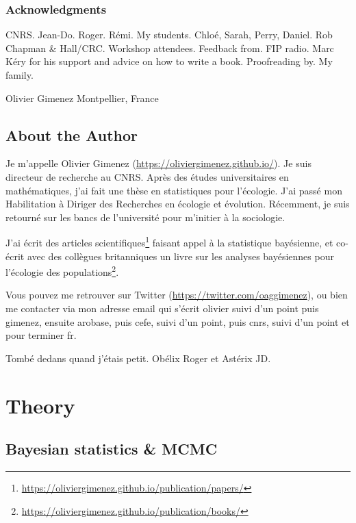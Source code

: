 \documentclass[
  12pt,
]{krantz}
\renewcommand{\href}[2]{#2\footnote{\url{#1}}}
\begin{document}
\hypertarget{acknowledgments}{%
\section*{Acknowledgments}\label{acknowledgments}}


CNRS. Jean-Do. Roger. Rémi. My students. Chloé, Sarah, Perry, Daniel. Rob Chapman \& Hall/CRC. Workshop attendees. Feedback from. FIP radio. Marc Kéry for his support and advice on how to write a book. Proofreading by. My family.

\begin{flushright}
Olivier Gimenez
Montpellier, France
\end{flushright}

\hypertarget{about-the-author}{%
\chapter*{About the Author}\label{about-the-author}}


Je m'appelle Olivier Gimenez (\url{https://oliviergimenez.github.io/}). Je suis directeur de recherche au CNRS. Après des études universitaires en mathématiques, j'ai fait une thèse en statistiques pour l'écologie. J'ai passé mon Habilitation à Diriger des Recherches en écologie et évolution. Récemment, je suis retourné sur les bancs de l'université pour m'initier à la sociologie.

J'ai écrit des \href{https://oliviergimenez.github.io/publication/papers/}{articles scientifiques} faisant appel à la statistique bayésienne, et co-écrit avec des collègues britanniques un \href{https://oliviergimenez.github.io/publication/books/}{livre sur les analyses bayésiennes pour l'écologie des populations}.

Vous pouvez me retrouver sur Twitter (\url{https://twitter.com/oaggimenez}), ou bien me contacter via mon adresse email qui s'écrit olivier suivi d'un point puis gimenez, ensuite arobase, puis cefe, suivi d'un point, puis cnrs, suivi d'un point et pour terminer fr.

Tombé dedans quand j'étais petit. Obélix Roger et Astérix JD.

\mainmatter

\hypertarget{part-theory}{%
\part{Theory}\label{part-theory}}

\hypertarget{crashcourse}{%
\chapter{Bayesian statistics \& MCMC}\label{crashcourse}}
\end{document}
